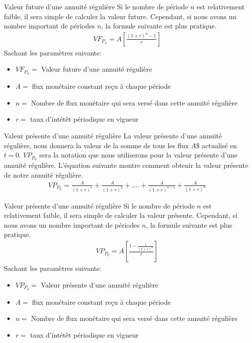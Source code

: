 \documentclass[11pt]{beamer}
\begin{document}
\begin{frame}{Valeur future d'une annuité régulière}
Si le nombre de période $n$ est relativement faible, il sera simple de calculer la valeur future. Cependant, si nous avons un nombre important de périodes $n$, la formule suivante est plus pratique. 
\begin{align*}
VF_{P_n}=A \left[\frac{(1+r)^n-1}{r} \right]
\end{align*}
Sachant les paramètres suivants: 
\begin{itemize}
\item $VF_{P_n}=$ Valeur future d'une annuité régulière 
\item $A=$ flux monétaire constant reçu à chaque période  
\item $n=$ Nombre de flux monétaire qui sera versé dans cette annuité régulière
\item $r=$ taux d'intétêt périodique en vigueur 
\end{itemize}
\end{frame}



\begin{frame}{Valeur présente d'une annuité régulière}
La valeur présente d'une annuité régulière, nous donnera la valeur de la somme de tous les flux $A\$$ actualisé en $t=0$. $VP_{P_0}$ sera la notation que nous utiliserons pour la valeur présente d'une annuité régulière. L'équation suivante montre comment obtenir la valeur présente de notre annuité régulière.  
\begin{align*}
VP_{P_0} = \frac{A}{(1+r)^{1}}+\frac{A}{(1+r)^{2}}+....+\frac{A}{(1+r)^{n-1}}+\frac{A}{(1+r)^{n}}
\end{align*}
\end{frame}


\begin{frame}{Valeur présente d'une annuité régulière}
Si le nombre de période $n$ est relativement faible, il sera simple de calculer la valeur présente. Cependant, si nous avons un nombre important de périodes $n$, la formule suivante est plus pratique. 
\begin{align*}
VP_{P_0}=A \left[ \frac{1-\frac{1}{(1+r)^n}}{r} \right]
\end{align*}
Sachant les paramètres suivants: 
\begin{itemize}
\item $VP_{P_0}=$ Valeur présente d'une annuité régulière 
\item $A=$ flux monétaire constant reçu à chaque période  
\item $n=$ Nombre de flux monétaire qui sera versé dans cette annuité régulière
\item $r=$ taux d'intétêt périodique en vigueur 
\end{itemize}
\end{frame}
\end{document}
